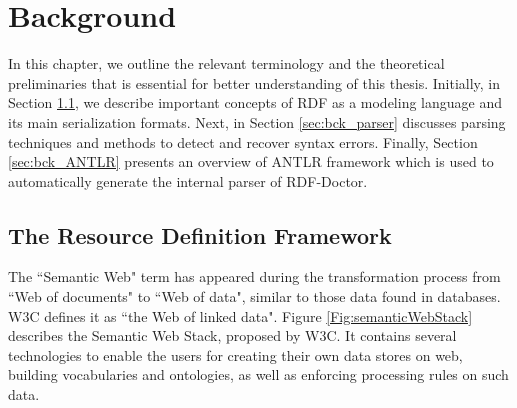 \chapter{Background}
\label{ch:preliminaries}

In this chapter, we outline the relevant terminology and the theoretical preliminaries that is essential for better understanding of this thesis.
Initially, in Section \ref{sec:bck_rdf_model}, we describe important concepts of RDF as a modeling language and its main serialization formats. 
Next, in Section \ref{sec:bck_parser} discusses parsing techniques and methods to detect and recover syntax errors. Finally, Section \ref{sec:bck_ANTLR} presents an overview of ANTLR framework which is used to automatically generate the internal parser of RDF-Doctor.

\section{The Resource Definition Framework}
\label{sec:bck_rdf_model}

The ``Semantic Web" \cite{W3C:SemanticWebTerm:Online} term  has appeared during the transformation process from ``Web of documents" to ``Web of data", similar to those data found in databases. 
W3C defines it as ``the Web of linked data". 
{Figure \ref{Fig:semanticWebStack}} describes the Semantic Web Stack, proposed by W3C. 
It contains several technologies to enable the users for creating their own data stores on web, building vocabularies and ontologies, as well as enforcing processing rules on such data.   

